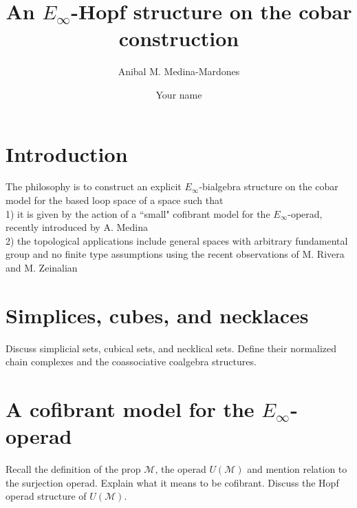 \documentclass{amsart}
\begin{document}
\title{An $E_\infty$-Hopf structure on the cobar construction}
\author{Anibal M. Medina-Mardones}
\address{Max Plank Institute for Mathematics, Bonn, Germany}
\address{Department of Mathematics, University of Notre Dame, Notre Dame, IN, USA}
\author{Your name}
\address{Your address}


\begin{abstract}
	
\end{abstract} 

\vspace*{-1cm}

\maketitle

\section{Introduction}
The philosophy is to construct an explicit $E_{\infty}$-bialgebra structure on the cobar model for the based loop space of a space such that
\\
1) it is given by the action of a ``small" cofibrant model for the $E_{\infty}$-operad, recently introduced by A. Medina
\\
2) the topological applications include general spaces with arbitrary fundamental group and no finite type assumptions using the recent observations of M. Rivera and M. Zeinalian 

\section{Simplices, cubes, and necklaces}
Discuss simplicial sets, cubical sets, and necklical sets. Define their normalized chain complexes and the coassociative coalgebra structures.

\section{A cofibrant model for the $E_{\infty}$-operad}

Recall the definition of the prop $\mathcal{M}$, the operad $U(\mathcal{M})$ and mention relation to the surjection operad. Explain what it means to be cofibrant. Discuss the Hopf operad structure of $U(\mathcal{M})$.  
\end{document}
